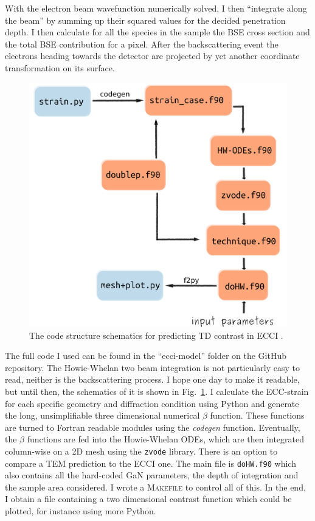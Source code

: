 With the electron beam wavefunction numerically solved, I then ``integrate along the beam'' by summing up their squared values for the decided penetration depth. I then calculate for all the species in the sample the BSE cross section and the total BSE contribution for a pixel. After the backscattering event the electrons heading towards the detector are projected by yet another coordinate transformation on its surface.

\begin{figure}[ht]
    \centering
    \includegraphics[width=0.6\linewidth]{Figures/code.png}
    \caption{ The code structure  schematics for predicting TD contrast in ECCI . }
    \label{fig:code}
\end{figure}

The full code I used can be found in  the ``ecci-model'' folder on the GitHub repository. The Howie-Whelan two beam integration is not particularly easy  to read, neither is the backscattering process. I hope one day to make it readable, but until then, the schematics of it is shown in Fig.~\ref{fig:code}. I calculate the ECC-strain for each specific geometry and diffraction condition using Python and generate the long, unsimplifiable three dimensional numerical $\beta$ function. These functions are turned to Fortran readable modules using the \textit{codegen} function. Eventually, the $\beta$ functions are fed into the Howie-Whelan ODEs, which are then integrated column-wise on a 2D mesh using the \texttt{zvode} library. There is an option to compare a TEM prediction to the ECCI one.   The main file is \texttt{doHW.f90} which also contains all the hard-coded GaN parameters, the depth of integration and the sample area considered. I wrote a \textsc{Makefile} to control all of this. In the end, I obtain a file containing a two dimensional contrast function which could be plotted, for instance using more Python. 

